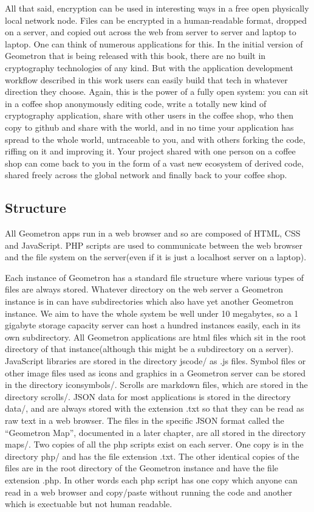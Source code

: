 All that said, encryption can be used in interesting ways in a free open physically local network node.  Files can be encrypted in a human-readable format, dropped on a server, and copied out across the web from server to server and laptop to laptop.  One can think of numerous applications for this.  In the initial version of Geometron that is being released with this book, there are no built in cryptography technologies of any kind.  But with the application development workflow described in this work users can easily build that tech in whatever direction they choose. Again, this is the power of a fully open system: you can sit in a coffee shop anonymously editing code, write a totally new kind of cryptography application, share with other users in the coffee shop, who then copy to github and share with the world, and in no time your application has spread to the whole world, untraceable to you, and with others forking the code, riffing on it and improving it.  Your project shared with one person on a coffee shop can come back to you in the form of a vast new ecosystem of derived code, shared freely across the global network and finally back to your coffee shop.  



\subsection{Structure}

All Geometron apps run in a web browser and so are composed of HTML, CSS and JavaScript.  PHP scripts are used to communicate between the web browser and the file system on the server(even if it is just a localhost server on a laptop).  

Each instance of Geometron has a standard file structure where various types of files are always stored.  Whatever directory on the web server a Geometron instance is in can have subdirectories which also have yet another Geometron instance. We aim to have the whole system be well under 10 megabytes, so a 1 gigabyte storage capacity server can host a hundred instances easily, each in its own subdirectory.  All Geometron applications are html files which sit in the root directory of that instance(although this might be a subdirectory on a server).  JavaScript libraries are stored in the directory jscode/ as .js files.  Symbol files or other image files used as icons and graphics in a Geometron server can be stored in the directory iconsymbols/.  Scrolls are markdown files, which are stored in the directory scrolls/.  JSON data for most applications is stored in the directory data/, and are always stored with the extension .txt so that they can be read as raw text in a web browser.  The files in the specific JSON format called the ``Geometron Map'', documented in a later chapter, are all stored in the directory maps/.  Two copies of all the php scripts exist on each server.  One copy is in the directory php/ and has the file extension .txt.  The other identical copies of the files are in the root directory of the Geometron instance and have the file extension .php. In other words each php script has one copy which anyone can read in a web browser and copy/paste without running the code and another which is exectuable but not human readable.  

